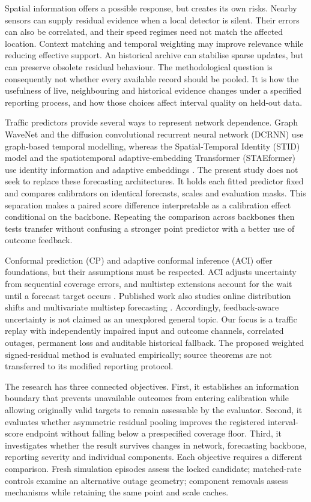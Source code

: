 \documentclass[pdflatex,sn-mathphys-num]{sn-jnl}
\begin{document}
Spatial information offers a possible response, but creates its own risks. Nearby sensors can supply residual evidence when a local detector is silent. Their errors can also be correlated, and their speed regimes need not match the affected location. Context matching and temporal weighting may improve relevance while reducing effective support. An historical archive can stabilise sparse updates, but can preserve obsolete residual behaviour. The methodological question is consequently not whether every available record should be pooled. It is how the usefulness of live, neighbouring and historical evidence changes under a specified reporting process, and how those choices affect interval quality on held-out data.

Traffic predictors provide several ways to represent network dependence. Graph WaveNet and the diffusion convolutional recurrent neural network (DCRNN) use graph-based temporal modelling, whereas the Spatial-Temporal Identity (STID) model and the spatiotemporal adaptive-embedding Transformer (STAEformer) use identity information and adaptive embeddings \citep{wu2019,li2018,shao2022,liu2023}. The present study does not seek to replace these forecasting architectures. It holds each fitted predictor fixed and compares calibrators on identical forecasts, scales and evaluation masks. This separation makes a paired score difference interpretable as a calibration effect conditional on the backbone. Repeating the comparison across backbones then tests transfer without confusing a stronger point predictor with a better use of outcome feedback.

Conformal prediction (CP) and adaptive conformal inference (ACI) offer foundations, but their assumptions must be respected. ACI adjusts uncertainty from sequential coverage errors, and multistep extensions account for the wait until a forecast target occurs \citep{gibbs2021,hallberg2024}. Published work also studies online distribution shifts and multivariate multistep forecasting \citep{gibbs2024,schlembach2025}. Accordingly, feedback-aware uncertainty is not claimed as an unexplored general topic. Our focus is a traffic replay with independently impaired input and outcome channels, correlated outages, permanent loss and auditable historical fallback. The proposed weighted signed-residual method is evaluated empirically; source theorems are not transferred to its modified reporting protocol.

The research has three connected objectives. First, it establishes an information boundary that prevents unavailable outcomes from entering calibration while allowing originally valid targets to remain assessable by the evaluator. Second, it evaluates whether asymmetric residual pooling improves the registered interval-score endpoint without falling below a prespecified coverage floor. Third, it investigates whether the result survives changes in network, forecasting backbone, reporting severity and individual components. Each objective requires a different comparison. Fresh simulation episodes assess the locked candidate; matched-rate controls examine an alternative outage geometry; component removals assess mechanisms while retaining the same point and scale caches.
\end{document}
